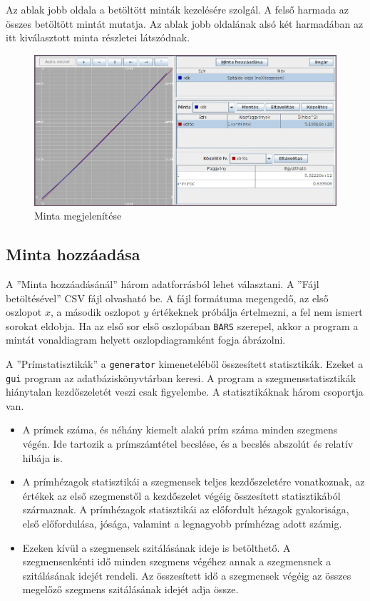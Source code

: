 Az ablak jobb oldala a betöltött minták kezelésére szolgál.
A felső harmada az összes betöltött mintát mutatja.
Az ablak jobb oldalának alsó két harmadában az itt kiválasztott minta részletei látszódnak.

\begin{figure}[H]
\caption{Minta megjelenítése}
\centering
\includegraphics[scale=0.5]{graph.png}
\end{figure}

\subsection{Minta hozzáadása}

A ''Minta hozzáadásánál'' három adatforrásból lehet választani.
A ''Fájl betöltésével'' CSV fájl olvasható be. A fájl formátuma megengedő, az első oszlopot $x$, a második oszlopot $y$ értékeknek próbálja értelmezni, a fel nem ismert sorokat eldobja.
Ha az első sor első oszlopában \texttt{BARS} szerepel, akkor a program a mintát vonaldiagram helyett oszlopdiagramként fogja ábrázolni.

A ''Prímstatisztikák'' a \texttt{generator} kimeneteléből összesített statisztikák.
Ezeket a \texttt{gui} program az adatbáziskönyvtárban keresi.
A program a szegmensstatisztikák hiánytalan kezdőszeletét veszi csak figyelembe.
A statisztikáknak három csoportja van.
\begin{itemize}
\item A prímek száma, és néhány kiemelt alakú prím száma minden szegmens végén.
Ide tartozik a prímszámtétel becslése, és a becslés abszolút és relatív hibája is.

\item A prímhézagok statisztikái a szegmensek teljes kezdőszeletére vonatkoznak, az értékek az első szegmenstől a kezdőszelet végéig összesített statisztikából származnak.
A prímhézagok statisztikái az előfordult hézagok gyakorisága, első előfordulása, jósága, valamint a legnagyobb prímhézag adott számig.

\item Ezeken kívül a szegmensek szitálásának ideje is betölthető.
A szegmensenkénti idő minden szegmens végéhez annak a szegmensnek a szitálásának idejét rendeli.
Az összesített idő a szegmensek végéig az összes megelőző szegmens szitálásának idejét adja össze.
\end{itemize}

